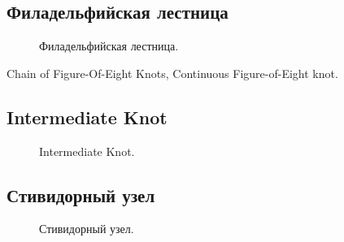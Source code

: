 \subsection{Филадельфийская лестница}

\begin{figure}[H]\centering
	\subfloat[Завязывание]{\label{ris:Continuous_Figure-of-Eight_1}
	\tcbox[enhanced jigsaw,colframe=black,opacityframe=0.5,opacityback=0.5,height=2.5cm]
		{\centering
			}
		}
\end{figure}
\begin{figure}[H]\centering
	\subfloat[Результат]{\label{ris:Continuous_Figure-of-Eight_2}
	\tcbox[enhanced jigsaw,colframe=black,opacityframe=0.5,opacityback=0.5,height=2.5cm]
		{\centering
			}
		}
	\caption{Филадельфийская лестница.}\label{ris:Continuous_Figure-of-Eight}
\end{figure}

Chain of Figure-Of-Eight Knots, Continuous Figure-of-Eight knot.

\subsection{Intermediate Knot}


\begin{figure}[H]\centering
	\begin{minipage}{1\linewidth}
		\begin{center}
			\tcbox[enhanced jigsaw,colframe=black,opacityframe=0.5,opacityback=0.5]
			{\centering{}}
		\end{center}
	\end{minipage}
\caption{Intermediate Knot.}
	\label{ris:Intermediate}
\end{figure}

\subsection{Стивидорный узел}

\begin{figure}[H]\centering
	\begin{minipage}{1\linewidth}
		\begin{center}
			\tcbox[enhanced jigsaw,colframe=black,opacityframe=0.5,opacityback=0.5]
			{\centering{}}
		\end{center}
	\end{minipage}
\caption{Стивидорный узел.}
	\label{ris:Stevedore}
\end{figure}

